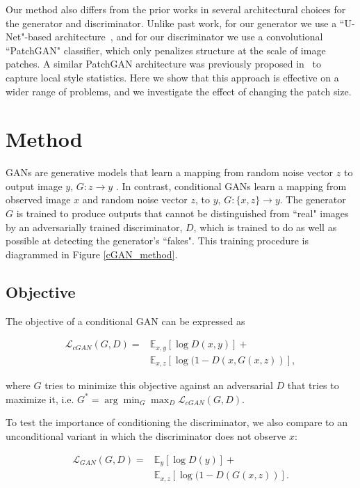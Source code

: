 Our method also differs from the prior works in several architectural choices for the generator and discriminator. Unlike past work, for our generator we use a ``U-Net"-based architecture~\cite{ronneberger2015u}, and for our discriminator we use a convolutional ``PatchGAN" classifier, which only penalizes structure at the scale of image patches. A similar PatchGAN architecture was previously proposed in~\cite{li2016precomputed} to capture local style statistics. Here we show that this approach is effective on a wider range of problems, and we investigate the effect of changing the patch size.

\section{Method}

GANs are generative models that learn a mapping from random noise vector $z$ to output image $y$, $G: z\rightarrow y$ \cite{goodfellow2014generative}. In contrast, conditional GANs learn a mapping from observed image $x$ and random noise vector $z$, to $y$, $G: \{x,z\}\rightarrow y$. The generator $G$ is trained to produce outputs that cannot be distinguished from ``real" images by an adversarially trained discriminator, $D$, which is trained to do as well as possible at detecting the generator's ``fakes". This training procedure is diagrammed in Figure \ref{cGAN_method}.

\subsection{Objective}

The objective of a conditional GAN can be expressed as

\begin{align}
    \mathcal{L}_{cGAN}(G,D) = &\mathbb{E}_{x,y}[\log D(x,y)] + \nonumber \\
                 &\mathbb{E}_{x,z}[\log (1-D(x,G(x,z))],\label{cGAN_equation}
\end{align}

where $G$ tries to minimize this objective against an adversarial $D$ that tries to maximize it, i.e. $G^*  = \arg\min_G \max_D \mathcal{L}_{cGAN}(G,D)$.

To test the importance of conditioning the discriminator, we also compare to an unconditional variant in which the discriminator does not observe $x$:

\begin{align}
    \mathcal{L}_{GAN}(G,D) = &\mathbb{E}_{y}[\log D(y)] + \nonumber \\
                 &\mathbb{E}_{x,z}[\log (1-D(G(x,z))].\label{GAN_equation}
\end{align}

